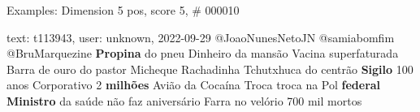 \begin{frame}{Examples: Dimension 5 pos, score 5, \# 000010}
\footnotesize
\begin{exampleblock}{text: t113943, user: unknown, 2022-09-29}
@JoaoNunesNetoJN @samiabomfim @BruMarquezine \textbf{Propina} do pneu Dinheiro 
da mansão Vacina superfaturada Barra de ouro do pastor Micheque Rachadinha 
Tchutxhuca do centrão \textbf{Sigilo} 100 anos Corporativo 2 \textbf{milhões} 
Avião da Cocaína Troca troca na Pol \textbf{federal} \textbf{Ministro} da saúde 
não faz aniversário Farra no velório  700 mil mortos 
\end{exampleblock}
\end{frame}
